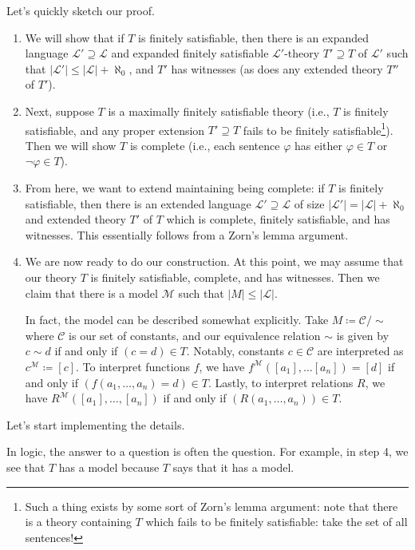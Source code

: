 \documentclass[../notes.tex]{subfiles}
\begin{document}
Let's quickly sketch our proof.
\begin{enumerate}
	\item We will show that if $T$ is finitely satisfiable, then there is an expanded language $\mathcal L'\supseteq\mathcal L$ and expanded finitely satisfiable $\mathcal L'$-theory $T'\supseteq T$ of $\mathcal L'$ such that $\left|\mathcal L'\right|\le\left|\mathcal L\right|+\aleph_0$, and $T'$ has witnesses (as does any extended theory $T''$ of $T'$).

	\item Next, suppose $T$ is a maximally finitely satisfiable theory (i.e., $T$ is finitely satisfiable, and any proper extension $T'\supseteq T$ fails to be finitely satisfiable\footnote{Such a thing exists by some sort of Zorn's lemma argument: note that there is a theory containing $T$ which fails to be finitely satisfiable: take the set of all sentences!}). Then we will show $T$ is complete (i.e., each sentence $\varphi$ has either $\varphi\in T$ or $\lnot\varphi\in T$).

	\item From here, we want to extend maintaining being complete: if $T$ is finitely satisfiable, then there is an extended language $\mathcal L'\supseteq\mathcal L$ of size $\left|\mathcal L'\right|=\left|\mathcal L\right|+\aleph_0$ and extended theory $T'$ of $T$ which is complete, finitely satisfiable, and has witnesses. This essentially follows from a Zorn's lemma argument.

	\item We are now ready to do our construction. At this point, we may assume that our theory $T$ is finitely satisfiable, complete, and has witnesses. Then we claim that there is a model $\mathcal M$ such that $\left|M\right|\le\left|\mathcal L\right|$.
	
	In fact, the model can be described somewhat explicitly. Take $M\coloneqq\mathcal C/{\sim}$ where $\mathcal C$ is our set of constants, and our equivalence relation $\sim$ is given by $c\sim d$ if and only if $(c=d)\in T$. Notably, constants $c\in\mathcal C$ are interpreted as $c^\mathcal M\coloneqq[c]$. To interpret functions $f$, we have $f^\mathcal M([a_1],\ldots[a_n])=[d]$ if and only if $(f(a_1,\ldots,a_n)=d)\in T$. Lastly, to interpret relations $R$, we have $R^\mathcal M([a_1],\ldots,[a_n])$ if and only if $(R(a_1,\ldots,a_n))\in T$.
\end{enumerate}
Let's start implementing the details.
\begin{remark}
	In logic, the answer to a question is often the question. For example, in step 4, we see that $T$ has a model because $T$ says that it has a model.
\end{remark}
\end{document}
